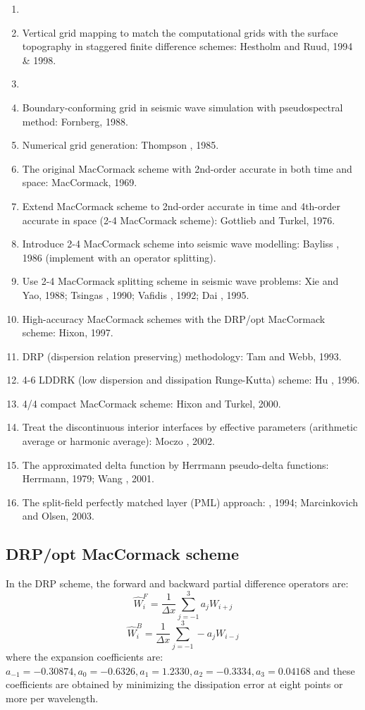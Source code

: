 \begin{enumerate}[\hspace{10mm}*]
  \item \sline
  \item Vertical grid mapping to match the computational grids with the surface topography in staggered finite difference schemes: Hestholm and Ruud, 1994 \& 1998.
  \item \sline
  \item Boundary-conforming grid in seismic wave simulation with pseudospectral method: Fornberg, 1988.
  \item Numerical grid generation: Thompson \etal, 1985.
  \item The original MacCormack scheme with 2nd-order accurate in both time and space: MacCormack, 1969.
  \item Extend MacCormack scheme to 2nd-order accurate in time and 4th-order accurate in space (2-4 MacCormack scheme): Gottlieb and Turkel, 1976.
  \item Introduce 2-4 MacCormack scheme into seismic wave modelling: Bayliss \etal, 1986 (implement with an operator splitting).
  \item Use 2-4 MacCormack splitting scheme in seismic wave problems: Xie and Yao, 1988; Tsingas \etal, 1990; Vafidis \etal, 1992; Dai \etal, 1995.
  \item High-accuracy MacCormack schemes with the DRP/opt MacCormack scheme: Hixon, 1997.
  \item DRP (dispersion relation preserving) methodology: Tam and Webb, 1993.
  \item 4-6 LDDRK (low dispersion and dissipation Runge-Kutta) scheme: Hu \etal, 1996.
  \item 4/4 compact MacCormack scheme: Hixon and Turkel, 2000.
  \item Treat the discontinuous interior interfaces by effective parameters (arithmetic average or harmonic average): Moczo \etal, 2002.
  \item The approximated delta function by Herrmann pseudo-delta functions: Herrmann, 1979; Wang \etal, 2001.
  \item The split-field perfectly matched layer (PML) approach: \Berenger, 1994; Marcinkovich and Olsen, 2003.
\end{enumerate}\par
\subsection{DRP/opt MacCormack scheme}
In the DRP scheme, the forward and backward partial difference operators are:
\[ \hat W_i^F=\frac{1}{\Delta x}\sum_{j=-1}^3a_jW_{i+j} \]
\[ \hat W_i^B=\frac{1}{\Delta x}\sum_{j=-1}^3-a_jW_{i-j} \]
where the expansion coefficients are: $a_{-1}=-0.30874,a_0=-0.6326,a_1=1.2330,a_2=-0.3334,a_3=0.04168$ and these coefficients are obtained by minimizing the dissipation error at eight points or more per wavelength.\par
